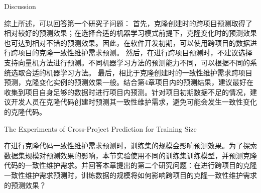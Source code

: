 
{Discussion}

综上所述，可以回答第一个研究子问题：
首先，克隆创建时的跨项目预测取得了相对较好的预测效果；在选择合适的机器学习模式前提下，克隆变化时的预测效果也可达到相对不错的预测效果。因此，在软件开发初期，可以使用跨项目的数据进行跨项目的克隆一致性维护需求预测。
然后，在进行跨项目预测时，不建议选择支持向量机方法进行预测。不同机器学习方法的预测能力不同，可以根据不同的系统选取合适的机器学习方法。
最后，相比于克隆创建时的一致性维护需求跨项目预测，克隆变化实例的预测效果一般。结合第4章项目内的预测结果，建议最好在收集到项目自身足够的数据时进行项目内预测。针对项目初期数据不足的情况，建议开发人员在克隆代码创建时预测其一致性维护需求，避免可能会发生一致性变化的克隆代码。

{The Experiments of Cross-Project Prediction for Training Size}

在进行克隆代码一致性维护需求预测时，训练集的规模会影响预测效果。为了探索数据集规模对预测效果的影响，本节实验使用不同的训练集训练模型，并预测克隆代码的一致性维护需求。并回答本章提出的第二个研究问题：在进行跨项目的克隆一致性维护需求预测时，训练数据的规模将如何影响跨项目的克隆一致性维护需求的预测效果？


